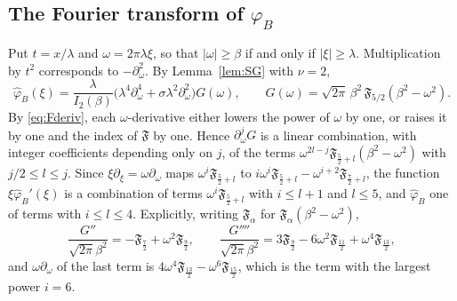 \documentclass[11pt]{amsart}
\theoremstyle{definition}
\theoremstyle{remark}
\numberwithin{equation}{section}
\newcommand{\F}{\mathfrak{F}}
\begin{document}
\subsection{The Fourier transform of \texorpdfstring{$\varphi_B$}{phi\_B}}
Put $t=x/\lambda$ and $\omega=2\pi\lambda\xi$, so that $|\omega|\ge\beta$ if and only if $|\xi|\ge\lambda$. Multiplication by $t^2$ corresponds to $-\partial_\omega^2$. By Lemma~\ref{lem:SG} with $\nu=2$,
\begin{equation}\label{eq:phiBhat}
\hat\varphi_B(\xi)=\frac{\lambda}{I_2(\beta)}\big(\lambda^4\partial_\omega^4+\sigma\lambda^2\partial_\omega^2\big)G(\omega),\qquad G(\omega)=\sqrt{2\pi}\,\beta^2\,\F_{5/2}(\beta^2-\omega^2).
\end{equation}
By \eqref{eq:Fderiv}, each $\omega$-derivative either lowers the power of $\omega$ by one, or raises it by one and the index of $\F$ by one. Hence $\partial_\omega^jG$ is a linear combination, with integer coefficients depending only on $j$, of the terms $\omega^{2l-j}\F_{\frac52+l}(\beta^2-\omega^2)$ with $j/2\le l\le j$. Since $\xi\partial_\xi=\omega\partial_\omega$ maps $\omega^i\F_{\frac52+l}$ to $i\omega^i\F_{\frac52+l}-\omega^{i+2}\F_{\frac72+l}$, the function $\xi\hat\varphi_B'(\xi)$ is a combination of terms $\omega^i\F_{\frac52+l}$ with $i\le l+1$ and $l\le5$, and $\hat\varphi_B$ one of terms with $i\le l\le4$. Explicitly, writing $\F_\alpha$ for $\F_\alpha(\beta^2-\omega^2)$,
\[
\frac{G''}{\sqrt{2\pi}\beta^2}=-\F_{\frac72}+\omega^2\F_{\frac92},\qquad
\frac{G''''}{\sqrt{2\pi}\beta^2}=3\F_{\frac92}-6\omega^2\F_{\frac{11}2}+\omega^4\F_{\frac{13}2},
\]
and $\omega\partial_\omega$ of the last term is $4\omega^4\F_{\frac{13}2}-\omega^6\F_{\frac{15}2}$, which is the term with the largest power $i=6$.
\end{document}

